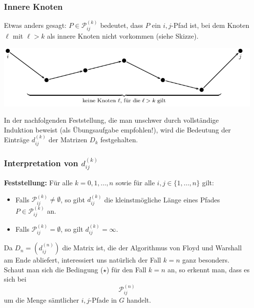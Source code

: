 \documentclass[smaller,xcolor=dvipsnames]{beamer}
\begin{document}
\begin{frame}
\frametitle{Innere Knoten}
 Etwas anders gesagt: $P \in \mathcal{P}_{ij}^{(k)}$ bedeutet, dass $P$ ein $i,j$-Pfad ist, bei dem Knoten $\ell$ mit $\ell > k$ als innere Knoten nicht vorkommen (siehe Skizze).

\begin{center}
\includegraphics{fig102.pdf}
\end{center}

In der nachfolgenden Feststellung, die man unschwer durch vollständige Induktion beweist (als Übungsaufgabe empfohlen!), wird die Bedeutung der Einträge $d_{ij}^{(k)}$ der Matrizen $D_k$ festgehalten.
\end{frame}

\begin{frame}
\frametitle{Interpretation von $d_{ij}^{(k)}$}
\textbf{Feststellung:}
Für alle $k=0,1,\ldots,n$ sowie für alle $i,j \in \{ 1,\ldots,n \}$ gilt:
\begin{itemize}
\item Falls $\mathcal{P}_{ij}^{(k)} \neq \emptyset$, so gibt $d_{ij}^{(k)}$ die kleinstmögliche Länge eines Pfades $P \in \mathcal{P}_{ij}^{(k)}$ an.
\item Falls $\mathcal{P}_{ij}^{(k)} = \emptyset$, so gilt $d_{ij}^{(k)} = \infty$.
\end{itemize} \medskip

Da $D_n = \left( d_{ij}^{(n)} \right)$ die Matrix ist, die der Algorithmus von Floyd und Warshall am Ende abliefert, interessiert uns natürlich der Fall $k=n$ ganz besonders. Schaut man sich die Bedingung ($\star$) für den Fall $k=n$ an, so erkennt man, dass es sich bei
\[
\mathcal{P}_{ij}^{(n)}
\]
um die Menge \alert{sämtlicher} $i,j$-Pfade in $G$ handelt. 
\end{frame}
\end{document}
